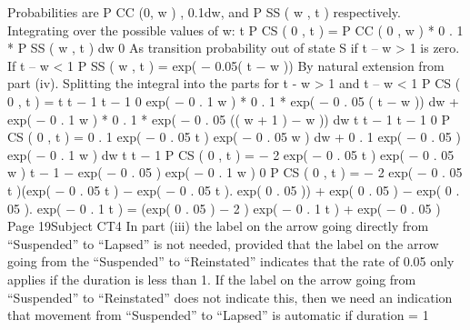 Probabilities are P CC (0, w ) , 0.1dw, and P SS ( w , t ) respectively.
Integrating over the possible values of w:
t
P CS ( 0 , t ) = \int P CC ( 0 , w ) * 0 . 1 * P SS ( w , t ) dw
0
As transition probability out of state S if t – w > 1 is zero.
If t – w < 1
P SS ( w , t ) = exp( − 0.05( t − w ))
By natural extension from part (iv).
Splitting the integral into the parts for t - w > 1 and t – w < 1
P CS ( 0 , t ) =
t t − 1
t − 1 0
\int exp( − 0 . 1 w ) * 0 . 1 * exp( − 0 . 05 ( t − w )) dw + \int exp( − 0 . 1 w ) * 0 . 1 * exp( − 0 . 05 (( w + 1 ) − w )) dw
t t − 1
t − 1 0
P CS ( 0 , t ) = 0 . 1 exp( − 0 . 05 t ) \int exp( − 0 . 05 w ) dw + 0 . 1 exp( − 0 . 05 ) \int exp( − 0 . 1 w ) dw
t
t − 1
P CS ( 0 , t ) = − 2 exp( − 0 . 05 t ) exp( − 0 . 05 w ) t − 1 − exp( − 0 . 05 ) exp( − 0 . 1 w ) 0
P CS ( 0 , t ) = − 2 exp( − 0 . 05 t )(exp( − 0 . 05 t ) − exp( − 0 . 05 t ). exp( 0 . 05 )) + exp( 0 . 05 ) − exp( 0 . 05 ). exp( − 0 . 1 t )
= (exp( 0 . 05 ) − 2 ) exp( − 0 . 1 t ) + exp( − 0 . 05 )
Page 19Subject CT4 %
In part (iii) the label on the arrow going directly from “Suspended” to “Lapsed” is not
needed, provided that the label on the arrow going from the “Suspended” to “Reinstated”
indicates that the rate of 0.05 only applies if the duration is less than 1. If the label on the
arrow going from “Suspended” to “Reinstated” does not indicate this, then we need an
indication that movement from “Suspended” to “Lapsed” is automatic if duration = 1

